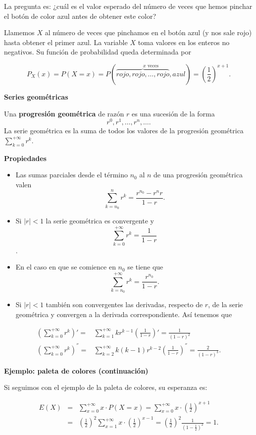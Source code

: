 \documentclass[]{book}
\begin{document}
La pregunta es: ¿cuál es el valor esperado del
número de veces que hemos pinchar el botón de color azul antes de obtener este color?

Llamemos \(X\) al número de veces que pinchamos en el botón azul (y nos sale rojo) hasta
obtener el primer azul. La variable \(X\) toma valores en los enteros no negativos. Su
función de probabilidad queda determinada por

\[
P_X(x)=P(X=x)=P(\stackrel{x \mbox{ veces}}{\overbrace{rojo, rojo,\ldots,rojo},azul})
=\left(\frac12\right)^{x+1}.
\]

\textbf{Series geométricas}

Una \textbf{progresión geométrica} de razón \(r\) es una sucesión de la forma\\
\[
r^0, r^1,\ldots,r^n,\ldots.
\]
La serie geométrica es la suma de todos los
valores de la progresión geométrica \(\displaystyle\sum_{k=0}^{+\infty} r^k\).

\textbf{Propiedades}

\begin{itemize}
\item
  Las sumas parciales desde el término \(n_0\) al \(n\) de una progresión geométrica valen
  \[
  \sum_{k=n_0}^n r^k=\frac{r^{n_0}- r^n r}{1-r}.
  \]
\item
  Si \(|r|<1\) la serie geométrica es convergente y \[\sum_{k=0}^{+\infty }
  r^k=\frac1{1-r}\].
\item
  En el caso en que se comience en \(n_0\) se tiene que
  \[\sum_{k=n_0}^{+\infty} r^k=\frac{r^{n_0}}{1-r}.\]
\item
  Si \(|r|<1\) también son convergentes las derivadas, respecto de \(r\), de la serie geométrica y convergen a la derivada correspondiente. Así tenemos que
\end{itemize}

\begin{eqnarray*}
\left(\sum_{k=0}^{+\infty} r^k\right)'= & \sum_{k=1}^{+\infty}k
r^{k-1} \left(\frac1{1-r}\right)'=\frac1{(1-r)^2}\\
\left(\sum_{k=0}^{+\infty} r^k\right)^{''}=& \sum_{k=2}^{+\infty}k (k-1)
r^{k-2}\left(\frac1{1-r}\right)^{''}=\frac2{(1-r)^3}.
\end{eqnarray*}

\textbf{Ejemplo: paleta de colores (continuación)}

Si seguimos con el ejemplo de la paleta de colores, su esperanza es:

\begin{eqnarray*}
E(X)&=&\sum_{x=0}^{+\infty} x\cdot P(X=x)=\sum_{x=0}^{+\infty} x\cdot
\left(\frac12\right)^{x+1}\\
&= & \left(\frac12\right)^2\sum_{x=1}^{+\infty} x\cdot
\left(\frac12\right)^{x-1}=\left(\frac12\right)^2
\frac1{\left(1-\frac12\right)^2}=1.
\end{eqnarray*}
\end{document}
